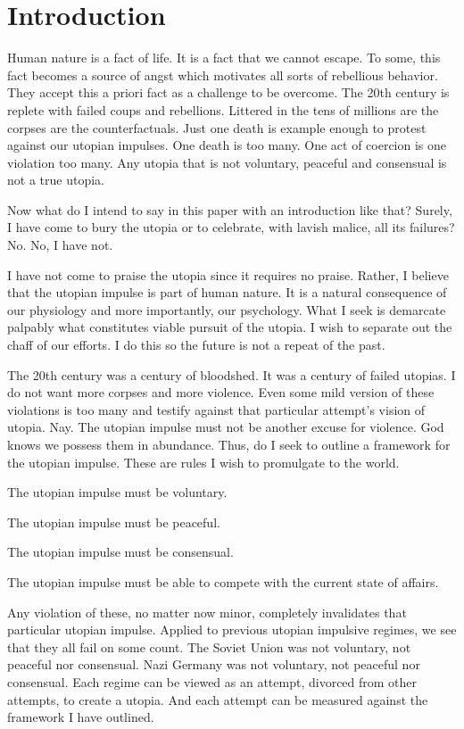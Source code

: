 \documentclass[12pt]{article}
\begin{document}
\pagebreak

\tableofcontents

\pagebreak

\section{Introduction}
Human nature is a fact of life.
It is a fact that we cannot escape.
To some, this fact becomes a source of angst which motivates all sorts of rebellious behavior.
They accept this a priori fact as a challenge to be overcome.
The 20th century is replete with failed coups and rebellions.
Littered in the tens of millions are the corpses are the counterfactuals.
Just one death is example enough to protest against our utopian impulses.
One death is too many.
One act of coercion is one violation too many.
Any utopia that is not voluntary, peaceful and consensual is not a true utopia.

Now what do I intend to say in this paper with an introduction like that?
Surely, I have come to bury the utopia or to celebrate, with lavish malice, all its failures?
No.
No, I have not.

I have not come to praise the utopia since it requires no praise.
Rather, I believe that the utopian impulse is part of human nature.
It is a natural consequence of our physiology and more importantly, our psychology.
What I seek is demarcate palpably what constitutes viable pursuit of the utopia.
I wish to separate out the chaff of our efforts.
I do this so the future is not a repeat of the past.

The 20th century was a century of bloodshed.
It was a century of failed utopias.
I do not want more corpses and more violence.
Even some mild version of these violations is too many and testify against that particular attempt's vision of utopia.
Nay.
The utopian impulse must not be another excuse for violence.
God knows we possess them in abundance.
Thus, do I seek to outline a framework for the utopian impulse.
These are rules I wish to promulgate to the world.

The utopian impulse must be voluntary.

The utopian impulse must be peaceful.

The utopian impulse must be consensual.

The utopian impulse must be able to compete with the current state of affairs.

Any violation of these, no matter now minor, completely invalidates that particular utopian impulse.
Applied to previous utopian impulsive regimes, we see that they all fail on some count.
The Soviet Union was not voluntary, not peaceful nor consensual.
Nazi Germany was not voluntary, not peaceful nor consensual.
Each regime can be viewed as an attempt, divorced from other attempts, to create a utopia.
And each attempt can be measured against the framework I have outlined.
\end{document}
